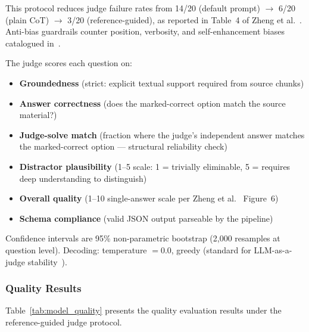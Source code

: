 This protocol reduces judge failure rates from 14/20 (default prompt) $\to$ 6/20 (plain CoT) $\to$ 3/20 (reference-guided), as reported in Table~4 of Zheng et al.~\cite{zheng2023llmjudge}. Anti-bias guardrails counter position, verbosity, and self-enhancement biases catalogued in~\cite{zheng2023llmjudge,li2024llmjudgesurvey}.

The judge scores each question on:
\begin{itemize}
    \item \textbf{Groundedness} (strict: explicit textual support required from source chunks)
    \item \textbf{Answer correctness} (does the marked-correct option match the source material?)
    \item \textbf{Judge-solve match} (fraction where the judge's independent answer matches the marked-correct option --- structural reliability check)
    \item \textbf{Distractor plausibility} (1--5 scale: 1 = trivially eliminable, 5 = requires deep understanding to distinguish)
    \item \textbf{Overall quality} (1--10 single-answer scale per Zheng et al.~\cite{zheng2023llmjudge} Figure~6)
    \item \textbf{Schema compliance} (valid JSON output parseable by the pipeline)
\end{itemize}

Confidence intervals are 95\% non-parametric bootstrap (2,000 resamples at question level). Decoding: temperature $= 0.0$, greedy (standard for LLM-as-a-judge stability~\cite{zheng2023llmjudge}).

\subsubsection{Quality Results}

Table~\ref{tab:model_quality} presents the quality evaluation results under the reference-guided judge protocol.

